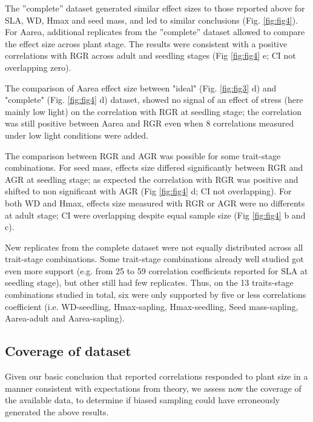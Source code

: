 \documentclass[a4paper,11pt]{article}
\begin{document}
The ''complete'' dataset generated similar effect sizes to those reported above for SLA, WD, Hmax and seed mass, and led to similar conclusions (Fig. \ref{fig:fig4}). For Aarea, additional replicates from the ''complete'' dataset allowed to compare the effect size across plant stage. The results were consistent with a positive correlations with RGR across adult and seedling stages (Fig \ref{fig:fig4} e; CI not overlapping zero). 

The comparison of Aarea effect size between "ideal" (Fig. \ref{fig:fig3} d) and "complete" (Fig. \ref{fig:fig4} d) dataset, showed no signal of an effect of stress (here mainly low light) on the correlation with RGR at seedling stage; the correlation was still positive between Aarea and RGR even when 8 correlations measured under low light conditions were added. 

The comparison between RGR and AGR was possible for some trait-stage combinations. For seed mass, effects size differed significantly between RGR and AGR at seedling stage; as expected the correlation with RGR was positive and shifted to non significant with AGR (Fig \ref{fig:fig4} d; CI not overlapping). For both WD and Hmax, effects size measured with RGR or AGR were no differents at adult stage; CI were overlapping despite equal sample size (Fig \ref{fig:fig4} b and c).

New replicates from the complete dataset were not equally distributed across all trait-stage combinations. Some trait-stage combinations already well studied got even more support (e.g. from 25 to 59 correlation coefficients reported for SLA at seedling stage), but other still had few replicates. Thus, on the 13 traits-stage combinations studied in total, six were only supported by five or less correlations coefficient (i.e. WD-seedling, Hmax-sapling, Hmax-seedling, Seed mass-sapling, Aarea-adult and Aarea-sapling).

\subsection*{Coverage of dataset}

Given our basic conclusion that reported correlations responded to plant size in a manner consistent with expectations from theory, we assess now the coverage of the available data, to determine if biased sampling could have erroneously generated the above results.
\end{document}
